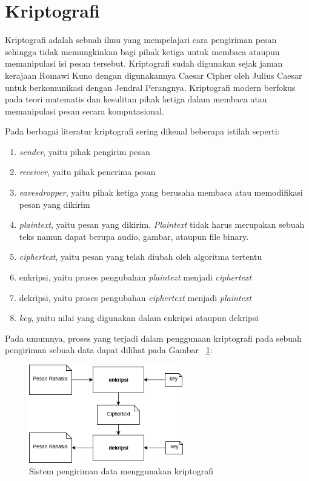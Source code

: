 \section{Kriptografi}
  Kriptografi adalah sebuah ilmu yang mempelajari cara pengiriman pesan sehingga tidak memungkinkan bagi pihak ketiga untuk membaca ataupun memanipulasi isi pesan tersebut. Kriptografi sudah digunakan sejak jaman kerajaan Romawi Kuno dengan digunakannya Caesar Cipher oleh Julius Caesar untuk berkomunikasi dengan Jendral Perangnya. Kriptografi modern berfokus pada teori matematis dan kesulitan pihak ketiga dalam membaca atau memanipulasi pesan secara komputasional.

  Pada berbagai literatur kriptografi sering dikenal beberapa istilah seperti:
  \begin{enumerate}[label=\roman*.]
    \item \textit{sender}, yaitu pihak pengirim pesan
    \item \textit{receiver}, yaitu pihak penerima pesan
    \item \textit{eavesdropper}, yaitu pihak ketiga yang berusaha membaca atau memodifikasi pesan yang dikirim
    \item \textit{plaintext}, yaitu pesan yang dikirim. \textit{Plaintext} tidak harus merupakan sebuah teks namun dapat berupa audio, gambar, ataupun file binary.
    \item \textit{ciphertext}, yaitu pesan yang telah diubah oleh algoritma tertentu
    \item enkripsi, yaitu proses pengubahan \textit{plaintext} menjadi \textit{ciphertext}
    \item dekripsi, yaitu proses pengubahan \textit{ciphertext} menjadi \textit{plaintext}
    \item \textit{key}, yaitu nilai yang digunakan dalam enkripsi ataupun dekripsi
  \end{enumerate}

  Pada umumnya, proses yang terjadi dalam penggunaan kriptografi pada sebuah pengiriman sebuah data dapat dilihat pada Gambar ~\ref{fig:krypto_system}:

  \begin{figure}[h]
    \centering
    \includegraphics[width=0.6\textwidth]{resources/img/ch-2/crypto-system.jpg}
    \caption{Sistem pengiriman data menggunakan kriptografi}
    \label{fig:krypto_system}
  \end{figure}

